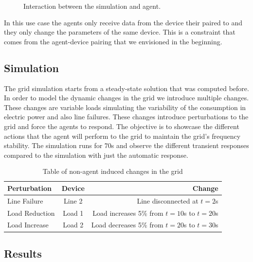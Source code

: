 \documentclass{article}
\begin{document}
\begin{figure}[h]
    \centering
    \caption{Interaction between the simulation and agent.}
    \label{fig:sim_agent_interaction}
\end{figure}

In this use case the agents only receive data from the device their paired to and they only change the parameters of the same device. This is a constraint that comes from the agent-device pairing that we envisioned in the beginning. 

\subsection{Simulation}
The grid simulation starts from a steady-state solution that was computed before. In order to model the dynamic changes in the grid we introduce multiple changes. These changes are variable loads simulating the variability of the consumption in electric power and also line failures. These changes introduce perturbations to the grid and force the agents to respond. The objective is to showcase the different actions that the agent will perform to the grid to maintain the grid's frequency stability. The simulation runs for $70$s and observe the different transient responses compared to the simulation with just the automatic response.

\begin{table}[h]
    \centering
    \begin{tabular}{|l|c|r|}
    \hline
    Perturbation & Device & Change \\
    \hline
    Line Failure & Line 2 & Line disconnected at $t =2$s\\
    Load Reduction & Load 1 & Load increases 5\% from $t =10$s to $t =20$s\\
    Load Increase & Load 2 & Load decreases 5\% from $t =20$s to $t =30$s\\
    \hline
    \end{tabular}
    \caption{Table of non-agent induced changes in the grid}
    \label{tab:example}
\end{table}

\subsection*{Results}
\end{document}
